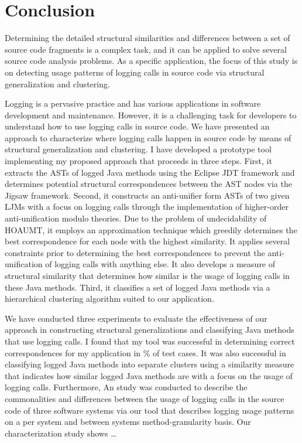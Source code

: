 
\chapter{Conclusion}  \label{conc}
Determining the detailed structural similarities and differences between a set of source code fragments is a complex task, and it can be applied to solve several source code analysis problems. As a specific application, the focus of this study is on detecting usage patterns of logging calls in source code via structural generalization and clustering.

Logging is a pervasive practice and has various applications in software development and maintenance. However, it is a challenging task for developers to understand how to use logging calls in source code. We have presented an approach to characterize where logging calls happen in source code by means of structural generalization and clustering. 
I have developed a prototype tool implementing my proposed approach that proceeds in three steps. First, it extracts the ASTs of logged Java methods using the Eclipse JDT framework and determines potential structural correspondences between the AST nodes via the Jigsaw framework. Second, it constructs an anti-unifier form ASTs of two given LJMs with a focus on logging calls through the implementation of higher-order anti-unification modulo theories. Due to the problem of undecidability of HOAUMT, it employs an approximation technique which greedily determines the best correspondence for each node with the highest similarity. It applies several constraints prior to determining the best correspondences to prevent the anti-unification of logging calls with anything else. It also develops a measure of structural similarity that determines how similar is the usage of logging calls in these Java methods.  Third, it classifies a set of logged Java methods via a hierarchical clustering algorithm suited to our application.


We have conducted three experiments to evaluate the effectiveness of our approach in constructing structural generalizations and classifying Java methods that use logging calls.
I found that my tool was successful in determining correct correspondences for my application in \% of test cases. It was also successful in classifying logged Java methods into separate clusters using a similarity measure that indicates how similar logged Java methods are with a focus on the usage of logging calls. Furthermore, An study was conducted to describe the commonalities and differences between the usage of logging calls in the source code of three software systems via our tool that describes logging usage patterns on a per system and between systems method-granularity basis. Our characterization study shows …


